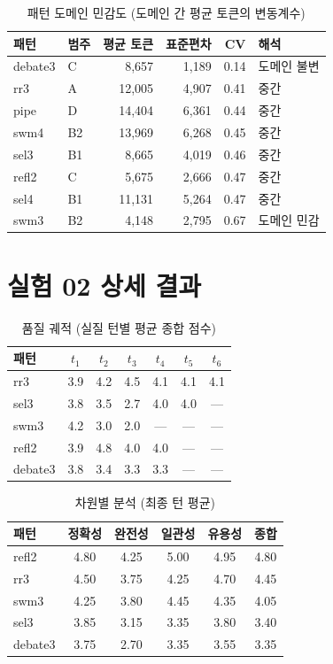 \documentclass[a4paper,11pt]{article}
\begin{document}
\begin{table}[H]
\centering
\caption{패턴 도메인 민감도 (도메인 간 평균 토큰의 변동계수)}
\label{tab:domain-cv}
{\small
\begin{tabular}{llrrrl}
\toprule
패턴 & 범주 & 평균 토큰 & 표준편차 & CV & 해석 \\
\midrule
debate3 & C  & 8,657  & 1,189 & 0.14 & 도메인 불변 \\
rr3     & A  & 12,005 & 4,907 & 0.41 & 중간 \\
pipe    & D  & 14,404 & 6,361 & 0.44 & 중간 \\
swm4    & B2 & 13,969 & 6,268 & 0.45 & 중간 \\
sel3    & B1 & 8,665  & 4,019 & 0.46 & 중간 \\
refl2   & C  & 5,675  & 2,666 & 0.47 & 중간 \\
sel4    & B1 & 11,131 & 5,264 & 0.47 & 중간 \\
swm3    & B2 & 4,148  & 2,795 & 0.67 & 도메인 민감 \\
\bottomrule
\end{tabular}
}
\end{table}

\section{실험 02 상세 결과}
\label{app:exp02-details}

\begin{table}[H]
\centering
\caption{품질 궤적 (실질 턴별 평균 종합 점수)}
\label{tab:quality-trajectory}
{\small
\begin{tabular}{lcccccc}
\toprule
패턴 & $t_1$ & $t_2$ & $t_3$ & $t_4$ & $t_5$ & $t_6$ \\
\midrule
rr3     & 3.9 & 4.2 & 4.5 & 4.1 & 4.1 & 4.1 \\
sel3    & 3.8 & 3.5 & 2.7 & 4.0 & 4.0 & --- \\
swm3    & 4.2 & 3.0 & 2.0 & --- & --- & --- \\
refl2   & 3.9 & 4.8 & 4.0 & 4.0 & --- & --- \\
debate3 & 3.8 & 3.4 & 3.3 & 3.3 & --- & --- \\
\bottomrule
\end{tabular}
}
\end{table}

\begin{table}[H]
\centering
\caption{차원별 분석 (최종 턴 평균)}
\label{tab:dimension-analysis}
{\small
\begin{tabular}{lccccc}
\toprule
패턴 & 정확성 & 완전성 & 일관성 & 유용성 & 종합 \\
\midrule
refl2   & 4.80 & 4.25 & 5.00 & 4.95 & 4.80 \\
rr3     & 4.50 & 3.75 & 4.25 & 4.70 & 4.45 \\
swm3    & 4.25 & 3.80 & 4.45 & 4.35 & 4.05 \\
sel3    & 3.85 & 3.15 & 3.35 & 3.80 & 3.40 \\
debate3 & 3.75 & 2.70 & 3.35 & 3.55 & 3.35 \\
\bottomrule
\end{tabular}
}
\end{table}
\end{document}
